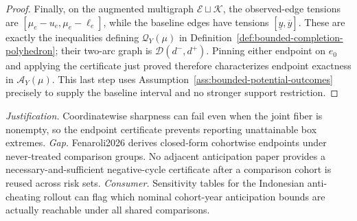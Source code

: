 \documentclass{article}
\begin{document}
\begin{proof}
Finally, on the augmented multigraph \(\mathcal E\sqcup\mathcal K\), the observed-edge tensions are \([\mu_e-u_e,\mu_e-\ell_e]\), while the baseline edges have tensions \([\underline y,\overline y]\).  These are exactly the inequalities defining \(\mathcal Q_Y(\mu)\) in Definition~\ref{def:bounded-completion-polyhedron}; their two-arc graph is \(\mathcal D(d^-,d^+)\).  Pinning either endpoint on \(e_0\) and applying the certificate just proved therefore characterizes endpoint exactness in \(\mathcal A_Y(\mu)\).  This last step uses Assumption~\ref{ass:bounded-potential-outcomes} precisely to supply the baseline interval and no stronger support restriction.
\end{proof}
\par\smallskip\noindent \textit{Justification.} Coordinatewise sharpness can fail even when the joint fiber is nonempty, so the endpoint certificate prevents reporting unattainable box extremes. \textit{Gap.} Fenaroli2026 derives closed-form cohortwise endpoints under never-treated comparison groups. No adjacent anticipation paper provides a necessary-and-sufficient negative-cycle certificate after a comparison cohort is reused across risk sets. \textit{Consumer.} Sensitivity tables for the Indonesian anti-cheating rollout can flag which nominal cohort-year anticipation bounds are actually reachable under all shared comparisons.
\end{document}

